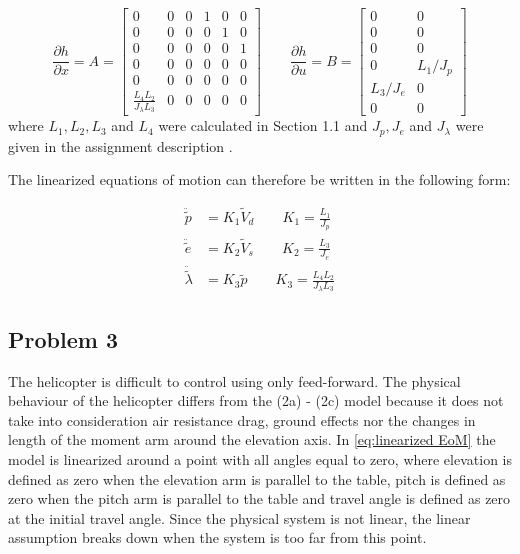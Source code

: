 \begin{equation}
  \label{eq:Linearized Jacobians}
  \frac{\partial h}{\partial x} = A =
  \begin{bmatrix}
    0 & 0 & 0 & 1 & 0 & 0 \\
    0 & 0 & 0 & 0 & 1 & 0 \\
    0 & 0 & 0 & 0 & 0 & 1 \\
    0 & 0 & 0 & 0 & 0 & 0 \\
    0 & 0 & 0 & 0 & 0 & 0 \\
    \frac{L_4L_2}{J_\lambda L_3} & 0 & 0 & 0 & 0 & 0
  \end{bmatrix}
  \qquad
  \frac{\partial h}{\partial u} = B =
  \begin{bmatrix}
    0 & 0 \\
    0 & 0 \\
    0 & 0 \\
    0 & L_1/J_p \\
    L_3/J_e & 0 \\
    0 & 0
  \end{bmatrix}
\end{equation}
where $L_1, L_2, L_3$ and $L_4$ were calculated in Section 1.1 and
$J_p, J_e$ and $J_\lambda$ were given in the assignment description
\cite[p.14]{assignment}.


The linearized equations of motion can therefore be written in the
following form:

\begin{subequations}
  \label{eq:linearized EoM}
  \begin{align}
    \ddot{\tilde{p}} &= K_1\tilde{V}_d \qquad K_1 = \frac{L_1}{J_p} \label{eq:linearized pitch EoM}\\
    \ddot{\tilde{e}} &= K_2\tilde{V}_s \qquad K_2 = \frac{L_3}{J_e} \label{eq:linearized elevation EoM}\\
    \ddot{\tilde{\lambda}} &= K_3\tilde{p} \qquad K_3 = \frac{L_4L_2}{J_\lambda L_3} \label{eq:linearized travel EoM}
  \end{align}
\end{subequations}
\subsection{Problem 3}
The helicopter is difficult to control using only feed-forward. The
physical behaviour of the helicopter differs from the (2a) - (2c)
\cite[p.13]{assignment} model because it does not take into
consideration air resistance drag, ground effects nor the changes in
length of the moment arm around the elevation axis. In
\cref{eq:linearized EoM} the model is linearized around a point with
all
angles equal to zero, where elevation is defined as zero when the
elevation arm is parallel to the table, pitch is defined as zero when
the pitch arm is parallel to the table and travel angle is defined as
zero at the initial travel angle. Since the physical system is not
linear, the linear assumption breaks down when the system is too far
from this point.

